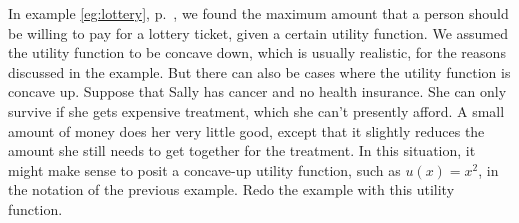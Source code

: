In example \ref{eg:lottery}, p.~\pageref{eg:lottery}, we found the
maximum amount that a person should be willing to pay for a lottery
ticket, given a certain utility function. We assumed the utility function
to be concave down, which is usually realistic, for the reasons
discussed in the example. But there can also be cases where the utility
function is concave up. Suppose that Sally has cancer and no health insurance.
She can only survive if she gets expensive treatment, which she can't presently
afford. A small amount of money does her very little good, except that it slightly
reduces the amount she still needs to get together for the treatment.
In this situation, it might make sense to posit a concave-up utility function,
such as $u(x)=x^2$, in the notation of the previous example.
Redo the example with this utility function.\answercheck

